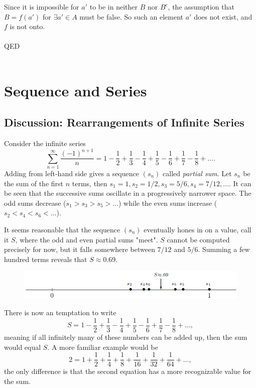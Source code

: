 \documentclass{article}
\begin{document}
            Since it is impossible for $a'$ to be in neither $B$ nor $B^c$, the assumption that $B=f(a')$ for $\exists a' \in A$ must be false. So such an element $a'$ does not exist, and $f$ is not onto.\\ \\
            QED\\ \\
        
        \section{Sequence and Series}
        \subsection{Discussion: Rearrangements of Infinite Series}
            Consider the infinite series
            \begin{equation*}
                \sum_{n=1}^\infty \frac{(-1)^{n+1}}{n} = 1 - \frac{1}{2} + \frac{1}{3} - \frac{1}{4} + \frac{1}{5} - \frac{1}{6} + \frac{1}{7} - \frac{1}{8} + \dots.    
            \end{equation*}
            Adding from left-hand side gives a sequence $(s_n)$ called \textit{partial sum}. Let $s_n$ be the sum of the first $n$ terms, then $s_1 = 1,s_2=1/2,s_3=5/6,s_4=7/12,\dots$. It can be seen that the successive sums oscillate in a progressively narrower space. The odd sums decrease ($s_1>s_3>s_5>\dots$) while the even sums increase ($s_2<s_4<s_6<\dots$).
            
            It seems reasonable that the sequence $(s_n)$ eventually hones in on a value, call it $S$, where the odd and even partial sums "meet". $S$ cannot be computed precisely for now, but it falls somewhere between $7/12$ and $5/6$. Summing a few hundred terms reveals that $S\approx0.69$.
            \begin{figure}[ht!]
                \centering
                \includegraphics[width=0.9\linewidth]{figs/2.1.png}
            \end{figure}
            
            There is now an temptation to write
            \begin{equation}
                S = 1 - \frac{1}{2} + \frac{1}{3} - \frac{1}{4} + \frac{1}{5} - \frac{1}{6} + \frac{1}{7} - \frac{1}{8} + \dots,
            \label{infinite sum}
            \end{equation}
            meaning if all infinitely many of these numbers can be added up, then the sum would equal $S$. A more familiar example would be
            \begin{equation*}
                2 = 1 + \frac{1}{2} + \frac{1}{4} + \frac{1}{8} + \frac{1}{16} + \frac{1}{32} + \frac{1}{64} + \dots,
            \end{equation*}
            the only difference is that the second equation has a more recognizable value for the sum.
            
\end{document}
